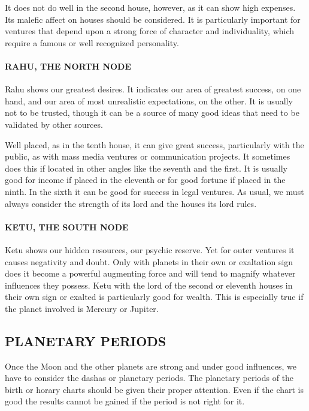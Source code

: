  

It does not do well in the second house, however, as it can show high expenses. Its malefic affect on houses should be considered. It is particularly important for ventures that depend upon a strong force of character and individuality, which require a famous or well recognized personality.

 

\paragraph{RAHU, THE NORTH NODE}

Rahu shows our greatest desires. It indicates our area of greatest success, on one hand, and our area of most unrealistic expectations, on the other. It is usually not to be trusted, though it can be a source of many good ideas that need to be validated by other sources.

 

Well placed, as in the tenth house, it can give great success, particularly with the public, as with mass media ventures or communication projects. It sometimes does this if located in other angles like the seventh and the first. It is usually good for income if placed in the eleventh or for good fortune if placed in the ninth. In the sixth it can be good for success in legal ventures. As usual, we must always consider the strength of its lord and the houses its lord rules.

 

\paragraph{KETU, THE SOUTH NODE }

Ketu shows our hidden resources, our psychic reserve. Yet for outer ventures it causes negativity and doubt. Only with planets in their own or exaltation sign does it become a powerful augmenting force and will tend to magnify whatever influences they possess. Ketu with the lord of the second or eleventh houses in their own sign or exalted is particularly good for wealth. This is especially true if the planet involved is Mercury or Jupiter.

 
\subsection{PLANETARY PERIODS}

 

Once the Moon and the other planets are strong and under good influences, we have to consider the dashas or planetary periods. The planetary periods of the birth or horary charts should be given their proper attention. Even if the chart is good the results cannot be gained if the period is not right for it.


